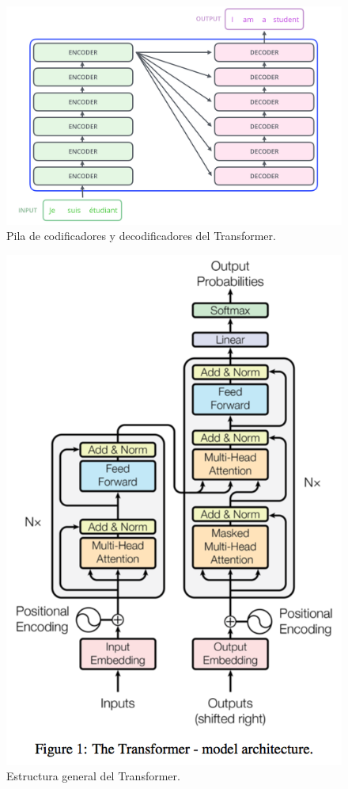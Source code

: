\begin{figure}[h]
  \centering
  \includegraphics[scale=0.2]{pics/The_transformer_encoder_decoder_stack.png}
  \caption{Pila de codificadores y decodificadores del Transformer.}
\end{figure}
\begin{figure}[h]
  \centering
  \includegraphics[scale=0.29]{pics/transformer.png}
  \caption{Estructura general del Transformer.}
\end{figure}

